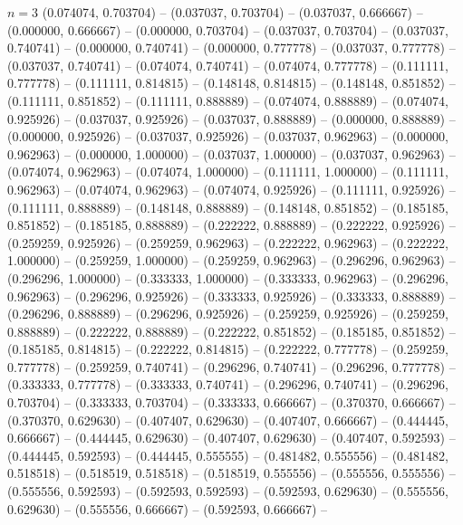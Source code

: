 \begin{zzfrac}{$n = 3$}
  (0.074074, 0.703704) --
  (0.037037, 0.703704) --
  (0.037037, 0.666667) --
  (0.000000, 0.666667) --
  (0.000000, 0.703704) --
  (0.037037, 0.703704) --
  (0.037037, 0.740741) --
  (0.000000, 0.740741) --
  (0.000000, 0.777778) --
  (0.037037, 0.777778) --
  (0.037037, 0.740741) --
  (0.074074, 0.740741) --
  (0.074074, 0.777778) --
  (0.111111, 0.777778) --
  (0.111111, 0.814815) --
  (0.148148, 0.814815) --
  (0.148148, 0.851852) --
  (0.111111, 0.851852) --
  (0.111111, 0.888889) --
  (0.074074, 0.888889) --
  (0.074074, 0.925926) --
  (0.037037, 0.925926) --
  (0.037037, 0.888889) --
  (0.000000, 0.888889) --
  (0.000000, 0.925926) --
  (0.037037, 0.925926) --
  (0.037037, 0.962963) --
  (0.000000, 0.962963) --
  (0.000000, 1.000000) --
  (0.037037, 1.000000) --
  (0.037037, 0.962963) --
  (0.074074, 0.962963) --
  (0.074074, 1.000000) --
  (0.111111, 1.000000) --
  (0.111111, 0.962963) --
  (0.074074, 0.962963) --
  (0.074074, 0.925926) --
  (0.111111, 0.925926) --
  (0.111111, 0.888889) --
  (0.148148, 0.888889) --
  (0.148148, 0.851852) --
  (0.185185, 0.851852) --
  (0.185185, 0.888889) --
  (0.222222, 0.888889) --
  (0.222222, 0.925926) --
  (0.259259, 0.925926) --
  (0.259259, 0.962963) --
  (0.222222, 0.962963) --
  (0.222222, 1.000000) --
  (0.259259, 1.000000) --
  (0.259259, 0.962963) --
  (0.296296, 0.962963) --
  (0.296296, 1.000000) --
  (0.333333, 1.000000) --
  (0.333333, 0.962963) --
  (0.296296, 0.962963) --
  (0.296296, 0.925926) --
  (0.333333, 0.925926) --
  (0.333333, 0.888889) --
  (0.296296, 0.888889) --
  (0.296296, 0.925926) --
  (0.259259, 0.925926) --
  (0.259259, 0.888889) --
  (0.222222, 0.888889) --
  (0.222222, 0.851852) --
  (0.185185, 0.851852) --
  (0.185185, 0.814815) --
  (0.222222, 0.814815) --
  (0.222222, 0.777778) --
  (0.259259, 0.777778) --
  (0.259259, 0.740741) --
  (0.296296, 0.740741) --
  (0.296296, 0.777778) --
  (0.333333, 0.777778) --
  (0.333333, 0.740741) --
  (0.296296, 0.740741) --
  (0.296296, 0.703704) --
  (0.333333, 0.703704) --
  (0.333333, 0.666667) --
  (0.370370, 0.666667) --
  (0.370370, 0.629630) --
  (0.407407, 0.629630) --
  (0.407407, 0.666667) --
  (0.444445, 0.666667) --
  (0.444445, 0.629630) --
  (0.407407, 0.629630) --
  (0.407407, 0.592593) --
  (0.444445, 0.592593) --
  (0.444445, 0.555555) --
  (0.481482, 0.555556) --
  (0.481482, 0.518518) --
  (0.518519, 0.518518) --
  (0.518519, 0.555556) --
  (0.555556, 0.555556) --
  (0.555556, 0.592593) --
  (0.592593, 0.592593) --
  (0.592593, 0.629630) --
  (0.555556, 0.629630) --
  (0.555556, 0.666667) --
  (0.592593, 0.666667) --

\end{zzfrac}
